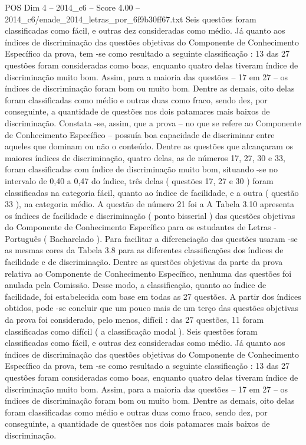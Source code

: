 \begin{textsample}{POS Dim 4 – 2014\_c6 – Score 4.00 – 2014\_c6/enade\_2014\_letras\_por\_6f9b30ff67.txt}
Seis questões foram classificadas como fácil, e outras dez consideradas como médio.
Já quanto aos índices de discriminação das questões objetivas do Componente de Conhecimento Específico da prova, tem -se como resultado a seguinte classificação : 13 das 27 questões foram consideradas como boas, enquanto quatro delas tiveram índice de discriminação muito bom.
Assim, para a maioria das questões – 17 em 27 – os índices de discriminação foram bom ou muito bom.
Dentre as demais, oito delas foram classificadas como médio e outras duas como fraco, sendo dez, por conseguinte, a quantidade de questões nos dois patamares mais baixos de discriminação.
Constata -se, assim, que a prova – no que se refere ao Componente de Conhecimento Específico – possuía boa capacidade de discriminar entre aqueles que dominam ou não o conteúdo.
Dentre as questões que alcançaram os maiores índices de discriminação, quatro delas, as de números 17, 27, 30 e 33, foram classificadas com índice de discriminação muito bom, situando -se no intervalo de 0,40 a 0,47 do índice, três delas ( questões 17, 27 e 30 ) foram classificadas na categoria fácil, quanto ao índice de facilidade, e a outra ( questão 33 ), na categoria médio.
A questão de número 21 foi a A Tabela 3.10 apresenta os índices de facilidade e discriminação ( ponto bisserial ) das questões objetivas do Componente de Conhecimento Específico para os estudantes de Letras - Português ( Bacharelado ).
Para facilitar a diferenciação das questões usaram -se as mesmas cores da Tabela 3.8 para as diferentes classificações dos índices de facilidade e de discriminação.
Dentre as questões objetivas da parte da prova relativa ao Componente de Conhecimento Específico, nenhuma das questões foi anulada pela Comissão.
Desse modo, a classificação, quanto ao índice de facilidade, foi estabelecida com base em todas as 27 questões.
A partir dos índices obtidos, pode -se concluir que um pouco mais de um terço das questões objetivas da prova foi considerado, pelo menos, difícil : das 27 questões, 11 foram classificadas como difícil ( a classificação modal ).
Seis questões foram classificadas como fácil, e outras dez consideradas como médio.
Já quanto aos índices de discriminação das questões objetivas do Componente de Conhecimento Específico da prova, tem -se como resultado a seguinte classificação : 13 das 27 questões foram consideradas como boas, enquanto quatro delas tiveram índice de discriminação muito bom.
Assim, para a maioria das questões – 17 em 27 – os índices de discriminação foram bom ou muito bom.
Dentre as demais, oito delas foram classificadas como médio e outras duas como fraco, sendo dez, por conseguinte, a quantidade de questões nos dois patamares mais baixos de discriminação.

\end{textsample}
